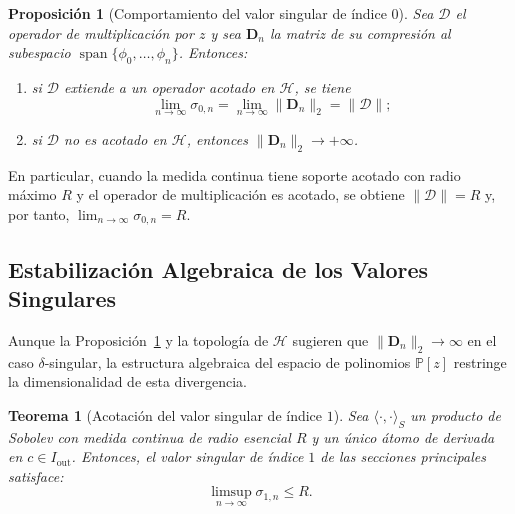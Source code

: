 \documentclass[12pt,a4paper]{article}
\newtheorem{theorem}{Teorema}
\newtheorem{proposition}{Proposición}
\theoremstyle{definition}
\theoremstyle{remark}
\newcommand{\Poly}{\mathbb{P}[z]}
\newcommand{\D}{\mathcal{D}}
\begin{document}
\begin{proposition}[Comportamiento del valor singular de índice $0$]\label{prop:convergencia_sigma}
  Sea $\D$ el operador de multiplicación por $z$ y sea $\mathbf{D}_n$ la matriz de su compresión al subespacio $\operatorname{span}\{\phi_0,\dots,\phi_n\}$. Entonces:
  \begin{enumerate}
    \item si $\D$ extiende a un operador acotado en $\mathcal{H}$, se tiene
          \[
            \lim_{n \to \infty} \sigma_{0,n} = \lim_{n \to \infty} \|\mathbf{D}_n\|_2 = \|\D\|;
          \]
    \item si $\D$ no es acotado en $\mathcal{H}$, entonces $\|\mathbf{D}_n\|_2 \to +\infty$.
  \end{enumerate}
\end{proposition}

En particular, cuando la medida continua tiene soporte acotado con radio máximo $R$ y el operador de multiplicación es acotado, se obtiene $\|\D\| = R$ y, por tanto, $\lim_{n \to \infty} \sigma_{0,n} = R$.

\subsection{Estabilización Algebraica de los Valores Singulares}

Aunque la Proposición~\ref{prop:convergencia_sigma} y la topología de $\mathcal{H}$ sugieren que $\|\mathbf{D}_n\|_2 \to \infty$ en el caso $\delta$-singular, la estructura algebraica del espacio de polinomios $\Poly$ restringe la dimensionalidad de esta divergencia.

\begin{theorem}[Acotación del valor singular de índice $1$]
  Sea $\langle \cdot, \cdot \rangle_S$ un producto de Sobolev con medida continua de radio esencial $R$ y un único átomo de derivada en $c \in I_{\mathrm{out}}$. Entonces, el valor singular de índice $1$ de las secciones principales satisface:
  $$ \limsup_{n \to \infty} \sigma_{1,n} \le R. $$
\end{theorem}
\end{document}
